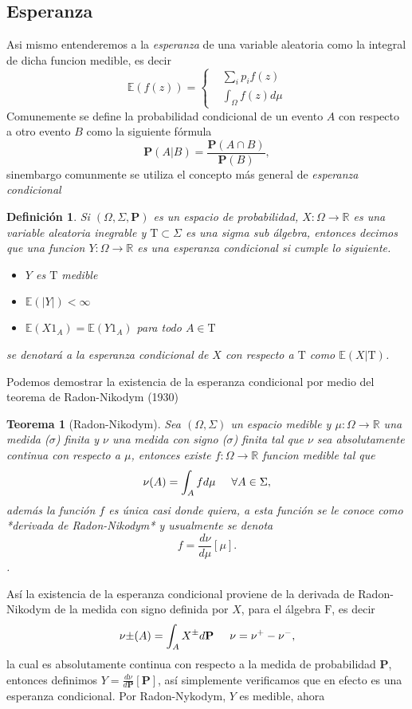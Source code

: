 \documentclass[letterpaper]{article}
\newtheorem{teorema}{Teorema}[section]
\newtheorem{def.}{Definici\'on}[section]
\newcommand{\prob}{\textbf{P}}
\newcommand{\esp}{\mathbb E}
\newcommand{\dem}{{\noindent \sc Demostraci\'on. }}
\newcommand{\re}{\ensuremath{\mathbb R }}
\begin{document}
\subsection{Esperanza}
\label{sec:orgb9cf0ec}
\noindent Asi mismo entenderemos a la \emph{esperanza} de una variable aleatoria como la integral de dicha funcion medible, es decir
\begin{equation}
    \esp(f(z))=
    \begin{cases}
        & \sum_{i} p_i f(z)\\
        & \int_{\Omega}f(z)d\mu
    \end{cases}
\end{equation}
Comunemente se define la probabilidad condicional de un evento \(A\) con respecto a otro evento \(B\) como la siguiente fórmula
\[
    \prob(A|B)=\frac{\prob(A\cap B)}{\prob(B)},
\]
\noindent sinembargo comunmente se utiliza el concepto más general de \emph{esperanza condicional}
\begin{def.}
    Si \((\Omega,\Sigma,\prob)\) es un espacio de probabilidad, \(X:\Omega\rightarrow\re\) es una variable aleatoria inegrable y \(\mathrm{T} \subset\Sigma\) es una sigma sub álgebra, entonces decimos que una funcion \(Y:\Omega\rightarrow\re\) es una \emph{esperanza} condicional si cumple lo siguiente.
\begin{itemize}
\item \(Y\) es \(\mathrm{T}\) medible
\item \(\esp(|Y|)<\infty\)
\item \(\esp(X 1_A)=\esp(Y1_A)\) para todo \(A\in\mathrm{T}\)
\end{itemize}
se denotará a la esperanza condicional de \(X\) con respecto a \(\mathrm{T}\) como \(\esp(X|\mathrm{T})\).
\end{def.}
\noindent\dem Podemos demostrar la existencia de la esperanza condicional por medio del teorema de Radon-Nikodym (1930)
\begin{teorema}[Radon-Nikodym]
    Sea $(\Omega,\Sigma)$ un espacio medible y $\mu:\Omega\rightarrow\re$ una medida ($\sigma$) finita y $\nu$ una medida con signo ($\sigma$) finita tal que $\nu$ sea absolutamente continua con respecto a $\mu$, entonces existe $f:\Omega\rightarrow\re$ funcion medible tal que
\begin{equation}
    \nu(A)=\int_{A} f d\mu \hspace{0.5cm}\forall A\in\Sigma,
\end{equation}
además la función $f$ es única casi donde quiera, a esta función se le conoce como *derivada de Radon-Nikodym* y usualmente se denota
\[
    f=\frac{d\nu}{d\mu}[\mu].
\].
\end{teorema}
\noindent Así la existencia de la esperanza condicional proviene de la derivada de Radon-Nikodym de la medida con signo definida por \(X\), para el álgebra \(\mathrm{F}\), es decir
\[
    \nu{\pm}(A)=\int_{A}X^{\pm}d\textbf{P}\hspace{0.5cm}\nu=\nu^{+}-\nu^{-},
\]
\noindent la cual es absolutamente continua con respecto a la medida de probabilidad \textbf{P}, entonces definimos \(Y=\frac{d\nu}{d\textbf{P}}[\textbf{P}]\), así simplemente verificamos que en efecto es una esperanza condicional. Por Radon-Nykodym, \(Y\) es medible, ahora
\end{document}

